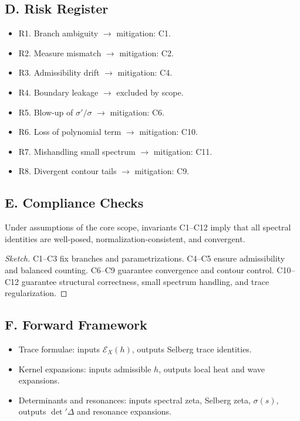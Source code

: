 \subsection*{D. Risk Register}
\label{subsec:risks}

\begin{itemize}
  \item R1. Branch ambiguity $\to$ mitigation: C1.
  \item R2. Measure mismatch $\to$ mitigation: C2.
  \item R3. Admissibility drift $\to$ mitigation: C4.
  \item R4. Boundary leakage $\to$ excluded by scope.
  \item R5. Blow-up of $\sigma'/\sigma$ $\to$ mitigation: C6.
  \item R6. Loss of polynomial term $\to$ mitigation: C10.
  \item R7. Mishandling small spectrum $\to$ mitigation: C11.
  \item R8. Divergent contour tails $\to$ mitigation: C9.
\end{itemize}

\subsection*{E. Compliance Checks}
\label{subsec:compliance}

\begin{lemma}
Under assumptions of the core scope, invariants C1–C12 imply that all spectral identities are well-posed, normalization-consistent, and convergent.
\end{lemma}

\begin{proof}[Sketch]
C1–C3 fix branches and parametrizations. 
C4–C5 ensure admissibility and balanced counting. 
C6–C9 guarantee convergence and contour control. 
C10–C12 guarantee structural correctness, small spectrum handling, and trace regularization.
\end{proof}

\subsection*{F. Forward Framework}
\label{subsec:forward}

\begin{itemize}
  \item Trace formulae: inputs $\mathcal E_X(h)$, outputs Selberg trace identities.
  \item Kernel expansions: inputs admissible $h$, outputs local heat and wave expansions.
  \item Determinants and resonances: inputs spectral zeta, Selberg zeta, $\sigma(s)$, outputs $\det'\Delta$ and resonance expansions.
\end{itemize}

